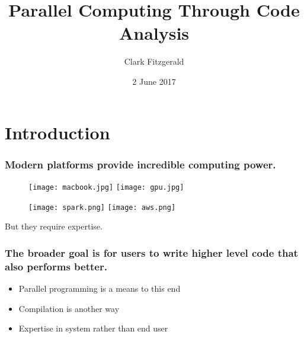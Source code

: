 \documentclass{beamer}
\begin{document}
\title{Parallel Computing Through Code Analysis}
\date{2 June 2017}
\author{Clark Fitzgerald}

\frame{\titlepage}



\section{Introduction}
\begin{frame}

\frametitle{Modern platforms provide incredible computing power.}


\begin{figure}
            \texttt{[image: macbook.jpg]}
            \texttt{[image: gpu.jpg]}
\end{figure}
\begin{figure}
            \texttt{[image: spark.png]}
            \texttt{[image: aws.png]}
\end{figure}

\pause 

But they require expertise.

\end{frame}
\begin{frame}

    \frametitle{The broader goal is for users to write higher level code
    that also performs better.}


    \begin{itemize}
        \item Parallel programming is a means to this end
        \item Compilation is another way
        \item Expertise in system rather than end user
    \end{itemize}

\end{frame}
\end{document}

